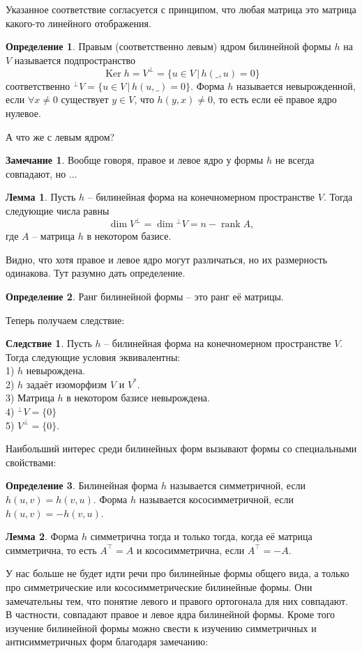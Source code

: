 \documentclass[10pt,a4paper,oneside]{book} %
\theoremstyle{definition}
\newtheorem*{rem}{Замечание}
\newtheorem*{defn}{Определение}
\newtheorem{lem}{Лемма}
\newtheorem{cor}{Следствие}
\newcommand{\rank}{\operatorname{rank}}
\DeclareMathOperator{\Ker}{Ker}
\def\dfn{\begin{defn}}
\def\edfn{\end{defn}}
\def\lm{\begin{lem}}
\def\elm{\end{lem}}
\def\crl{\begin{cor}}
\def\ecrl{\end{cor}}
\def\rm{\begin{rem}}
\def\erm{\end{rem}}
\begin{document}
Указанное соответствие согласуется с принципом, что любая матрица это матрица какого-то линейного отображения.


\dfn Правым (соответственно левым) ядром билинейной формы $h$ на $V$ называется подпространство $$\Ker h= V^{\bot}=\{u \in V\,| \,h(\_,u)=0\}$$
соответственно ${}^{\bot}V=\{u \in V\,| \, h(u,\_)=0\}$. Форма $h$ называется невырожденной, если $\forall x \neq 0$ существует $y \in V$, что $h(y,x)\neq 0$, то есть если её правое ядро нулевое.
\edfn

А что же с левым ядром?

\rm Вообще говоря, правое и левое ядро у формы $h$ не всегда совпадают, но ...
\erm

\lm Пусть $h$ -- билинейная форма  на конечномерном пространстве $V$. Тогда следующие числа равны 
$$\dim V^{\bot}= \dim {}^{\bot}V=n -\rank A,$$
где $A$ -- матрица $h$ в некотором базисе.
\elm

Видно, что хотя правое и левое ядро могут различаться, но их размерность одинакова. Тут разумно дать определение.

\dfn Ранг билинейной формы -- это ранг её матрицы.
\edfn

Теперь получаем следствие:
\crl Пусть $h$ -- билинейная форма  на конечномерном пространстве $V$. Тогда следующие условия эквивалентны:\\
1) $h$ невырождена.\\
2) $h$ задаёт изоморфизм $V$ и $V^*$.\\
3) Матрица $h$ в некотором базисе невырождена.\\
4) ${}^{\bot} V =\{0\}$\\
5) $V^{\bot}=\{0\}$.
\ecrl






Наибольший интерес среди билинейных форм вызывают формы со специальными свойствами:

\dfn Билинейная форма $h$ называется симметричной, если $h(u,v)=h(v,u)$. Форма $h$ называется кососимметричной, если $h(u,v)=-h(v,u)$.
\edfn

\lm  Форма $h$ симметрична тогда и только тогда, когда её матрица симметрична, то есть $A^{\top}=A$ и кососимметрична, если $A^{\top}=-A$.
\elm

У нас больше не будет идти речи про билинейные формы общего вида, а только про симметрические или кососимметрические билинейные формы. Они замечательны тем, что понятие левого и правого ортогонала для них совпадают. В частности, совпадают правое и левое ядра билинейной формы. Кроме того изучение билинейной формы можно свести к изучению симметричных и антисимметричных форм благодаря замечанию:
\end{document}
